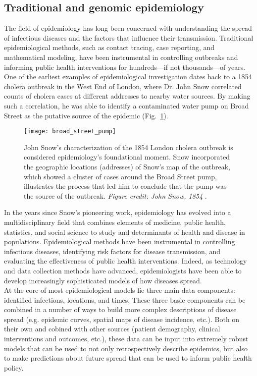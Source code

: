 \subsection{Traditional and genomic epidemiology}\label{sec:tradVsGenEpi}
The field of epidemiology has long been concerned with understanding the spread of infectious diseases and the factors that influence their transmission.
Traditional epidemiological methods, such as contact tracing, case reporting, and mathematical modeling, have been instrumental in controlling outbreaks and informing public health interventions for hundreds---if not thousands---of years.
One of the earliest examples of epidemiological investigation dates back to a 1854 cholera outbreak in the West End of London, where Dr. John Snow correlated counts of cholera cases at different addresses to nearby water sources.
By making such a correlation, he was able to identify a contaminated water pump on Broad Street as the putative source of the epidemic (Fig.~\ref{fig:broadStreetPump}).\\

\begin{figure}[ht]
  \centering
  \texttt{[image: broad\_street\_pump]}
  \caption[John Snow's map of the 1854 Broad Street cholera outbreak in London]{John Snow's characterization of the 1854 London cholera outbreak is considered epidemiology's foundational moment. Snow incorporated the geographic locations (addresses) of Snow's map of the outbreak, which showed a cluster of cases around the Broad Street pump, illustrates the process that led him to conclude that the pump was the source of the outbreak. \textit{Figure credit: John Snow, 1854} \citep{snow1854mode}.}
  \label{fig:broadStreetPump}
\end{figure}

In the years since Snow's pioneering work, epidemiology has evolved into a multidisciplinary field that combines elements of medicine, public health, statistics, and social science to study and determinants of health and disease in populations.
Epidemiological methods have been instrumental in controlling infectious diseases, identifying risk factors for disease transmission, and evaluating the effectiveness of public health interventions.
Indeed, as technology and data collection methods have advanced, epidemiologists have been able to develop increasingly sophisticated models of how diseases spread.\\

At the core of most epidemiological models lie three main data components: identified infections, locations, and times.
These three basic components can be combined in a number of ways to build more complex descriptions of disease spread (e.g. epidemic curves, spatial maps of disease incidence, etc.).
Both on their own and cobined with other sources (patient demography, clinical interventions and outcomes, etc.), these data can be input into extremely robust models that can be used to not only retrospectively describe epidemics, but also to make predictions about future spread that can be used to inform public health policy.\\

